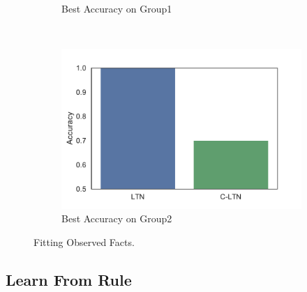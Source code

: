 \begin{figure}[!]
\begin{subfigure}[]{0.33\textwidth}
        \caption{Best Accuracy on Group1}
        \label{fig:fitting-best-accuracy-1}
    \end{subfigure}~~~~
    \begin{subfigure}[]{0.33\textwidth}
        \includegraphics[width=\textwidth]{img/bar2.pdf}
        \caption{Best Accuracy on Group2}
        \label{fig:fitting-best-accuracy-2}
    \end{subfigure}
    \caption{Fitting Observed Facts.}
    \label{fig:fitting}
\end{figure}

\subsection{Learn From Rule}

